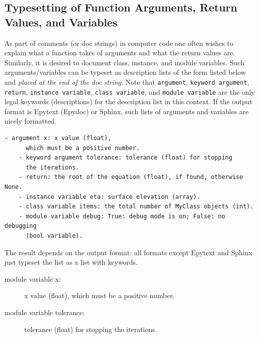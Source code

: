 \documentclass{article}
\begin{document}
\subsection{Typesetting of Function Arguments, Return Values, and Variables}

As part of comments (or doc strings) in computer code one often wishes
to explain what a function takes of arguments and what the return
values are. Similarly, it is desired to document class, instance, and
module variables.  Such arguments/variables can be typeset as
description lists of the form listed below and \emph{placed at the end of
the doc string}. Note that {\fontsize{10pt}{10pt}\verb!argument!}, {\fontsize{10pt}{10pt}\verb!keyword argument!}, {\fontsize{10pt}{10pt}\verb!return!},
{\fontsize{10pt}{10pt}\verb!instance variable!}, {\fontsize{10pt}{10pt}\verb!class variable!}, and {\fontsize{10pt}{10pt}\verb!module variable!} are the
only legal keywords (descriptions) for the description list in this
context.  If the output format is Epytext (Epydoc) or Sphinx, such lists of
arguments and variables are nicely formatted. 
\begin{Verbatim}[fontsize=\fontsize{9pt}{9pt},tabsize=8,baselinestretch=0.85,
fontfamily=tt,xleftmargin=7mm]
    - argument x: x value (float),
      which must be a positive number.
    - keyword argument tolerance: tolerance (float) for stopping
      the iterations.
    - return: the root of the equation (float), if found, otherwise None.
    - instance variable eta: surface elevation (array).
    - class variable items: the total number of MyClass objects (int).
    - module variable debug: True: debug mode is on; False: no debugging 
      (bool variable).
\end{Verbatim}
\noindent

The result depends on the output format: all formats except Epytext 
and Sphinx just typeset the list as a list with keywords.

\begin{description}
    \item[module variable x:] 
      x value (float),
      which must be a positive number.
    \item[module variable tolerance:] 
      tolerance (float) for stopping
      the iterations.
\end{description}



\printindex
\end{document}
